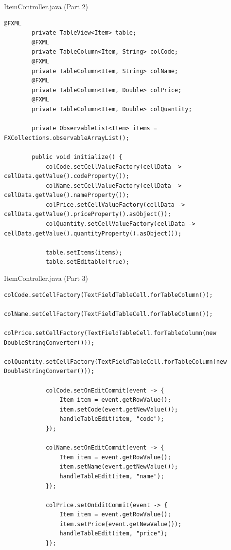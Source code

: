\documentclass[aspectratio=169, table]{beamer}
\begin{document}
\begin{frame}[fragile]{ItemController.java (Part 2)}
	\vspace{20pt}
	\begin{lstlisting}[style=JavaStyle]
		@FXML
		private TableView<Item> table;
		@FXML
		private TableColumn<Item, String> colCode;
		@FXML
		private TableColumn<Item, String> colName;
		@FXML
		private TableColumn<Item, Double> colPrice;
		@FXML
		private TableColumn<Item, Double> colQuantity;
		
		private ObservableList<Item> items = FXCollections.observableArrayList();
		
		public void initialize() {
			colCode.setCellValueFactory(cellData -> cellData.getValue().codeProperty());
			colName.setCellValueFactory(cellData -> cellData.getValue().nameProperty());
			colPrice.setCellValueFactory(cellData -> cellData.getValue().priceProperty().asObject());
			colQuantity.setCellValueFactory(cellData -> cellData.getValue().quantityProperty().asObject());
			
			table.setItems(items);
			table.setEditable(true);
		\end{lstlisting}
	\end{frame}
	
	\begin{frame}[fragile]{ItemController.java (Part 3)}
		\vspace{20pt}
		\begin{lstlisting}[style=JavaStyle]
			colCode.setCellFactory(TextFieldTableCell.forTableColumn());
			colName.setCellFactory(TextFieldTableCell.forTableColumn());
			colPrice.setCellFactory(TextFieldTableCell.forTableColumn(new DoubleStringConverter()));
			colQuantity.setCellFactory(TextFieldTableCell.forTableColumn(new DoubleStringConverter()));
			
			colCode.setOnEditCommit(event -> {
				Item item = event.getRowValue();
				item.setCode(event.getNewValue());
				handleTableEdit(item, "code");
			});
			
			colName.setOnEditCommit(event -> {
				Item item = event.getRowValue();
				item.setName(event.getNewValue());
				handleTableEdit(item, "name");
			});
			
			colPrice.setOnEditCommit(event -> {
				Item item = event.getRowValue();
				item.setPrice(event.getNewValue());
				handleTableEdit(item, "price");
			});
		\end{lstlisting}
	\end{frame}
	
\end{document}
